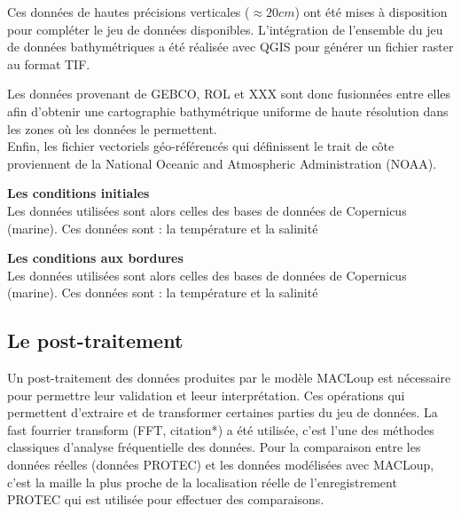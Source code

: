 \documentclass[10pt,a4paper,titlepage]{article}
\begin{document}
Ces données de hautes précisions verticales ($\approx 20 cm$) ont été mises à disposition pour compléter le jeu de données disponibles.
L'intégration de l'ensemble du jeu de données bathymétriques a été réalisée avec QGIS pour générer un fichier raster au format TIF.


Les données provenant de GEBCO, ROL et XXX sont donc fusionnées entre elles afin d'obtenir une cartographie bathymétrique uniforme de haute résolution dans les zones où les données le permettent.
\\
Enfin, les fichier vectoriels géo-référencés qui définissent le trait de côte proviennent de la National Oceanic and Atmospheric Administration (NOAA).


\textbf{Les conditions initiales}\\
\label{par:cond_init}
Les données utilisées sont alors celles des bases de données de Copernicus (marine).
Ces données sont : la température et la salinité %


\textbf{Les conditions aux bordures}\\
\label{par:cond_bords}
Les données utilisées sont alors celles des bases de données de Copernicus (marine).
Ces données sont : la température et la salinité %


\subsection{Le post-traitement}
\label{sub:postpro}
Un post-traitement des données produites par le modèle MACLoup est nécessaire pour permettre leur validation et leeur interprétation.
Ces opérations qui permettent d'extraire et de transformer certaines parties du jeu de données.
La fast fourrier transform (FFT, \alert{citation*}) a été utilisée, c'est l'une des méthodes classiques d'analyse fréquentielle des données.
Pour la comparaison entre les données réelles (données PROTEC) et les données modélisées avec MACLoup, c'est la maille la plus proche de la localisation réelle de l'enregistrement PROTEC qui est utilisée pour effectuer des comparaisons.

\end{document}
